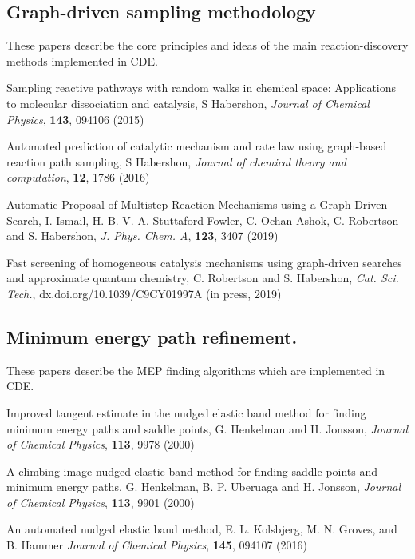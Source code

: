 \subsection*{Graph-\/driven sampling methodology}

These papers describe the core principles and ideas of the main reaction-\/discovery methods implemented in C\+DE.


\begin{DoxyItemize}
\item Sampling reactive pathways with random walks in chemical space\+: Applications to molecular dissociation and catalysis, S Habershon, {\itshape Journal of Chemical Physics}, {\bfseries 143}, 094106 (2015)
\item Automated prediction of catalytic mechanism and rate law using graph-\/based reaction path sampling, S Habershon, {\itshape Journal of chemical theory and computation}, {\bfseries 12}, 1786 (2016)
\item Automatic Proposal of Multistep Reaction Mechanisms using a Graph-\/\+Driven Search, I. Ismail, H. B. V. A. Stuttaford-\/\+Fowler, C. Ochan Ashok, C. Robertson and S. Habershon, {\itshape J. Phys. Chem. A}, {\bfseries 123}, 3407 (2019)
\item Fast screening of homogeneous catalysis mechanisms using graph-\/driven searches and approximate quantum chemistry, C. Robertson and S. Habershon, {\itshape Cat. Sci. Tech.}, dx.\+doi.\+org/10.1039/\+C9\+C\+Y01997A (in press, 2019)
\end{DoxyItemize}

\subsection*{Minimum energy path refinement.}

These papers describe the M\+EP finding algorithms which are implemented in C\+DE.


\begin{DoxyItemize}
\item Improved tangent estimate in the nudged elastic band method for finding minimum energy paths and saddle points, G. Henkelman and H. Jonsson, {\itshape Journal of Chemical Physics}, {\bfseries 113}, 9978 (2000)
\item A climbing image nudged elastic band method for finding saddle points and minimum energy paths, G. Henkelman, B. P. Uberuaga and H. Jonsson, {\itshape Journal of Chemical Physics}, {\bfseries 113}, 9901 (2000)
\item An automated nudged elastic band method, E. L. Kolsbjerg, M. N. Groves, and B. Hammer {\itshape Journal of Chemical Physics}, {\bfseries 145}, 094107 (2016)
\end{DoxyItemize}

